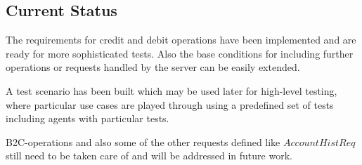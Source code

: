 \subsection{Current Status}

The requirements for credit and debit operations have been implemented and are ready for more sophisticated tests. Also the base conditions for including further operations or requests handled by the server can be easily extended.

A test scenario has been built which may be used later for high-level testing, where particular use cases are played through using a predefined set of tests including agents with particular tests.

B2C-operations and also some of the other requests defined like $AccountHistReq$ still need to be taken care of and will be addressed in future work.









